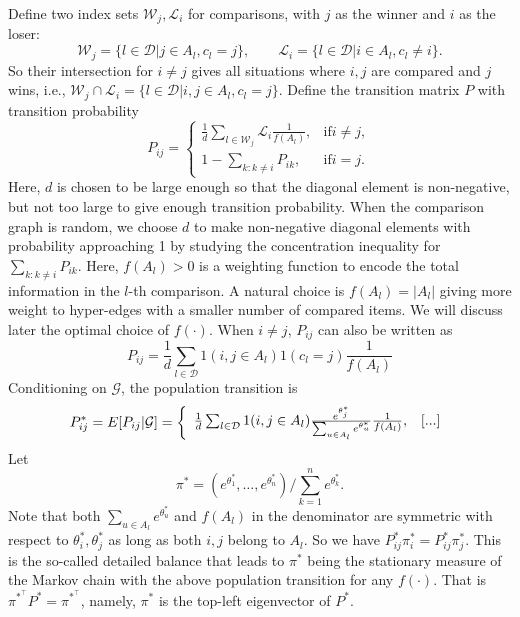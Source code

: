 Define two index sets \(\mathcal{W}_{j},\mathcal{L}_{i}\) for comparisons, with \(j\) as the winner and \(i\) as the loser:
\[
\mathcal{W}_{j} = \{l\in \mathcal{D}|j\in A_{l},c_{l} = j\} ,\qquad \mathcal{L}_{i} = \{l\in \mathcal{D}|i\in A_{l},c_{l}\neq i\} .
\]
So their intersection for \(i\neq j\) gives all situations where \(i,j\) are compared and \(j\) wins, i.e., \(\mathcal{W}_{j}\cap \mathcal{L}_{i} = \{l\in \mathcal{D}|i,j\in A_{l},c_{l} = j\}\). Define the transition matrix \(P\) with transition probability
\[
P_{ij} = \left\{ \begin{array}{ll}\frac{1}{d}\sum_{l\in \mathcal{W}_{j}}\mathcal{L}_{i}\frac{1}{f(A_{l})}, & \text{if} i\neq j, \\ 1 - \sum_{k:k\neq i}P_{ik}, & \text{if} i = j. \end{array} \right.
\]
Here, \(d\) is chosen to be large enough so that the diagonal element is non-negative, but not too large to give enough transition probability. When the comparison graph is random, we choose \(d\) to make non-negative diagonal elements with probability approaching 1 by studying the concentration inequality for \(\sum_{k:k\neq i}P_{i k}\). Here, \(f(A_{l}) > 0\) is a weighting function to encode the total information in the \(l\)-th comparison. A natural choice is \(f(A_{l}) = |A_{l}|\) giving more weight to hyper-edges with a smaller number of compared items. We will discuss later the optimal choice of \(f(\cdot)\). When \(i\neq j\), \(P_{i j}\) can also be written as
\[
P_{i j} = \frac{1}{d}\sum_{l\in \mathcal{D}}1(i,j\in A_{l})1(c_{l} = j)\frac{1}{f(A_{l})}
\]
Conditioning on \(\mathcal{G}\), the population transition is
\[
P_{i j}^{*} = E[P_{i j}|\mathcal{G}] = \left\{ \begin{array}{l l}{\frac{1}{d}\sum_{l\in \mathcal{D}}1(i,j\in A_{l})\frac{e^{\theta_{j}^{*}}}{\sum_{u\in A_{l}}e^{\theta_{u}^{*}}}\frac{1}{f(A_{l})},} & [...]
\end{array} \right.
\]
Let
\[
\pi^{*} = (e^{\theta_{1}^{*}},\ldots ,e^{\theta_{n}^{*}}) / \sum_{k = 1}^{n}e^{\theta_{k}^{*}}.
\]
Note that both \(\sum_{u\in A_{l}}e^{\theta_{u}^{*}}\) and \(f(A_{l})\) in the denominator are symmetric with respect to \(\theta_{i}^{*},\theta_{j}^{*}\) as long as both \(i,j\) belong to \(A_{l}\). So we have \(P_{i j}^{*}\pi_{i}^{*} = P_{i j}^{*}\pi_{j}^{*}\). This is the so-called detailed balance that leads to \(\pi^{*}\) being the stationary measure of the Markov chain with the above population transition for any \(f(\cdot)\). That is \(\pi^{*}^{\top}P^{*} = \pi^{*}^{\top}\), namely, \(\pi^{*}\) is the top-left eigenvector of \(P^{*}\).

